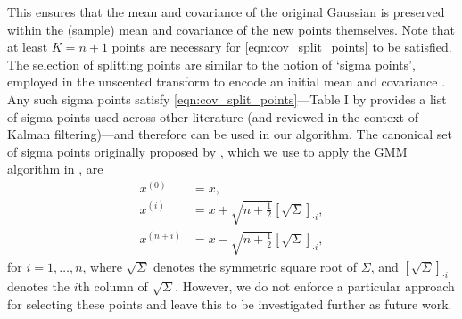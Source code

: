 This ensures that the mean and covariance of the original Gaussian is preserved within the (sample) mean and covariance of the new points themselves.
Note that at least \(K = n + 1\) points are necessary for \cref{eqn:cov_split_points} to be satisfied.
The selection of splitting points are similar to the notion of `sigma points', employed in the unscented transform to encode an initial mean and covariance \citep{Uhlmann_1995_DynamicMapBuilding,JulierEtAl_2000_NewMethodNonlinear}.
Any such sigma points satisfy \cref{eqn:cov_split_points}---Table I by \citet{MenegazEtAl_2015_SystematizationUnscentedKalman} provides a list of sigma points used across other literature (and reviewed in the context of Kalman filtering)---and therefore can be used in our algorithm.
The canonical set of sigma points originally proposed by \citet{Uhlmann_1995_DynamicMapBuilding}, which we use to apply the GMM algorithm in , are
\begin{subequations}\label{eqn:uhlman_sigma}
	\begin{align}
		x^{(0)}     & = x,                                                                                              \\
		x^{(i)}     & = x + \sqrt{n + \frac12}\left[\sqrt{\Sigma}\right]_{\cdot i}, \\
		x^{(n + i)} & = x - \sqrt{n + \frac12}\left[\sqrt{\Sigma}\right]_{\cdot i},
	\end{align}
\end{subequations}
for \(i = 1,\dotsc, n\), where \(\sqrt{\Sigma}\) denotes the symmetric square root of \(\Sigma\), and \(\left[\sqrt{\Sigma}\right]_{\cdot i}\) denotes the \(i\)th column of \(\sqrt{\Sigma}\).
However, we do not enforce a particular approach for selecting these points and leave this to be investigated further as future work.

